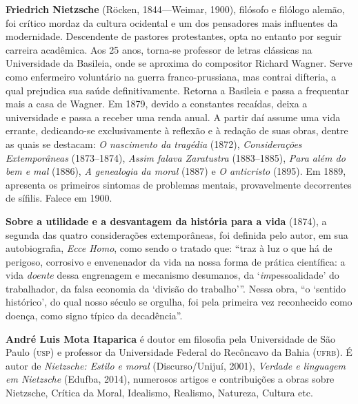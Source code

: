 \vspace*{7cm}

\noindent\textbf{Friedrich Nietzsche} (Röcken, 1844---Weimar, 1900), filósofo 
e filólogo alemão, foi crítico mordaz da cultura ocidental 
e um dos pensadores mais influentes da modernidade. Descendente de pastores 
protestantes, opta no entanto por seguir carreira acadêmica. 
Aos 25 anos, torna-se professor de letras clássicas na Universidade 
da Basileia, onde se aproxima do compositor Richard Wagner. Serve 
como enfermeiro voluntário na guerra franco-prussiana, mas contrai 
difteria, a qual prejudica sua saúde definitivamente. Retorna a 
Basileia e passa a frequentar mais a casa de Wagner. Em 
1879, devido a constantes recaídas, deixa a universidade e passa a 
receber uma renda anual. A partir daí assume uma vida errante, 
dedicando-se exclusivamente à reflexão e à redação de suas obras, 
dentre as quais se destacam: \textit{O nascimento da tragédia} (1872), 
\textit{Considerações Extemporâneas} (1873--1874), \textit{Assim falava Zaratustra} 
(1883--1885), \textit{Para além do bem e mal} (1886), \textit{A genealogia da moral} 
(1887) e \textit{O anticristo} (1895). Em 1889, apresenta os primeiros 
sintomas de problemas mentais, provavelmente decorrentes de sífilis. Falece em 1900.


\noindent\textbf{Sobre a utilidade e a desvantagem da história para a vida}
 (1874), a segunda das quatro considerações extemporâneas, foi definida pelo
 autor, em sua autobiografia, \textit{Ecce Homo}, como sendo o tratado que:
 ``traz à luz o que há de perigoso, corrosivo e envenenador da vida na nossa
 forma de prática científica: a vida \emph{doente} dessa engrenagem e mecanismo 
 desumanos, da `\emph{im}pessoalidade' do trabalhador, da falsa economia da 
 `divisão do trabalho'''. Nessa obra, ``o `sentido histórico', do qual nosso século se
 orgulha, foi pela primeira vez reconhecido como doença, como signo típico da
 decadência''. 


\textbf{André Luis Mota Itaparica} é doutor em filosofia pela Universidade  
de São Paulo (\textsc{usp}) e professor da Universidade Federal do Recôncavo da Bahia 
(\textsc{ufrb}). É autor de \textit{Nietzsche: Estilo e moral} (Discurso/Unijuí, 2001),  
\textit{Verdade e linguagem em Nietzsche} (Edufba, 2014), numerosos artigos e contribuições 
a obras sobre Nietzsche, Crítica da Moral, Idealismo, Realismo, Natureza, Cultura etc.

